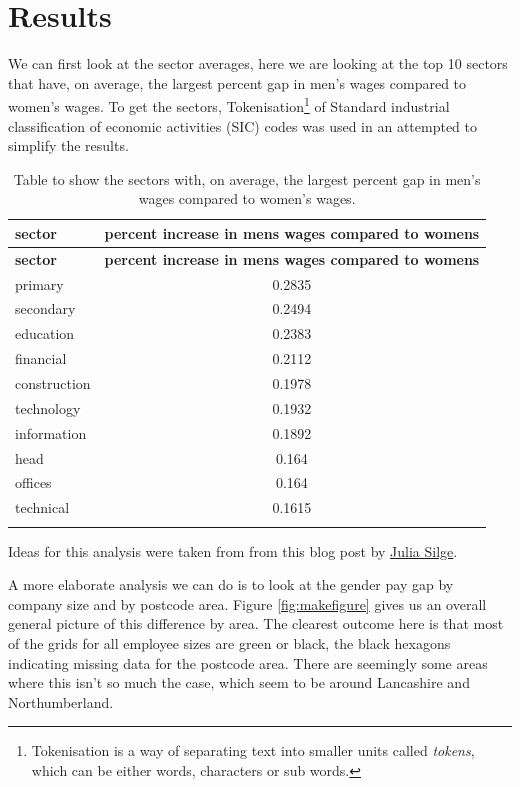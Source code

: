 \documentclass[
  11pt,
]{article}
\begin{document}
\newpage

\hypertarget{results}{%
\section{Results}\label{results}}

We can first look at the sector averages, here we are looking at the top
10 sectors that have, on average, the largest percent gap in men's wages
compared to women's wages. To get the sectors, Tokenisation\footnote{Tokenisation
  is a way of separating text into smaller units called \emph{tokens},
  which can be either words, characters or sub words.} of Standard
industrial classification of economic activities (SIC) codes was used in
an attempted to simplify the results.

\begin{longtable}[]{@{}lc@{}}
\toprule()
\textbf{sector} & \textbf{percent increase in mens wages compared to
womens} \\
\midrule()
\endfirsthead
\toprule()
\textbf{sector} & \textbf{percent increase in mens wages compared to
womens} \\
\midrule()
\endhead
primary & 0.2835 \\
secondary & 0.2494 \\
education & 0.2383 \\
financial & 0.2112 \\
construction & 0.1978 \\
technology & 0.1932 \\
information & 0.1892 \\
head & 0.164 \\
offices & 0.164 \\
technical & 0.1615 \\
\bottomrule()
\caption{Table to show the sectors with, on average, the largest percent
gap in men's wages compared to women's wages.}\tabularnewline
\end{longtable}

Ideas for this analysis were taken from from this blog post by
\href{https://juliasilge.com/blog/pay-gap-uk/}{Julia Silge}.

A more elaborate analysis we can do is to look at the gender pay gap by
company size and by postcode area. Figure \ref{fig:makefigure} gives us
an overall general picture of this difference by area. The clearest
outcome here is that most of the grids for all employee sizes are green
or black, the black hexagons indicating missing data for the postcode
area. There are seemingly some areas where this isn't so much the case,
which seem to be around Lancashire and Northumberland.
\end{document}
